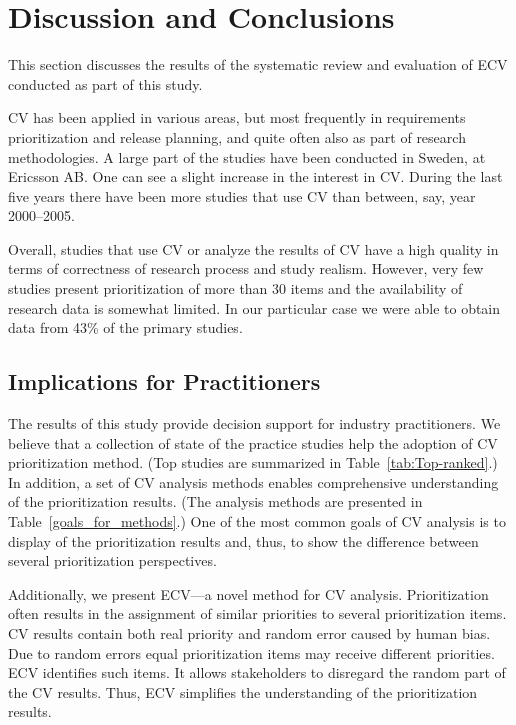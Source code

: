 
\section{Discussion and Conclusions\label{discussion}}
This section discusses the results of the systematic review and evaluation of ECV conducted as part of this study.

CV has been applied in various areas, but most frequently in requirements prioritization and release planning, and quite often also as part of research methodologies.
A large part of the studies have been conducted in Sweden, at Ericsson AB.%
One can see a slight increase in the interest in CV. During the last five years there have been more studies that use CV than between, say, year 2000--2005.

Overall, studies that use CV or analyze the results of CV have a high quality in terms of correctness of research process and study realism.
However, very few studies present prioritization of more than 30 items and the availability of research data is somewhat limited. In our particular case we were able to obtain data from 43\% of the primary studies.

\subsection{Implications for Practitioners}
The results of this study provide decision support for industry practitioners.
We believe that a collection of state of the practice studies help the adoption of CV prioritization method. (Top studies are summarized in Table~\ref{tab:Top-ranked}.)
In addition, a set of CV analysis methods enables comprehensive understanding of the prioritization results. 
(The analysis methods are presented in Table~\ref{goals_for_methods}.)
One of the most common goals of CV analysis is to display of the prioritization results and, thus, to show the difference between several prioritization perspectives.

Additionally, we present ECV---a novel method for CV analysis.
Prioritization often results in the assignment of similar priorities to several prioritization items.
CV results contain both real priority and random error caused by human bias.
Due to random errors equal prioritization items may receive different priorities.
ECV identifies such items. It allows stakeholders to disregard the random part of the CV results.
Thus, ECV simplifies the understanding of the prioritization results.

